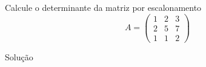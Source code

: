 \begin{question}
  Calcule o determinante da matriz por escalonamento
  \[
    A =
    \begin{pmatrix}
      1 & 2 & 3 \\
      2 & 5 & 7 \\
      1 & 1 & 2
    \end{pmatrix}
  \]
\end{question}

\begin{resolution}{Solução}
\end{resolution}

\endinput

Aplicamos
\[
L_2\leftarrow L_2-2L_1
\]
e
\[
L_3\leftarrow L_3-L_1.
\]

Essas operações não alteram o determinante
\[
\det(A)=
\begin{vmatrix}
1&2&3\\
0&1&1\\
0&-1&-1
\end{vmatrix}.
\]

Agora aplicamos
\[
L_3\leftarrow L_3+L_2.
\]

Obtemos
\[
\det(A)=
\begin{vmatrix}
1&2&3\\
0&1&1\\
0&0&0
\end{vmatrix}.
\]


Como a matriz é triangular,
\[
\det(A)=1\cdot1\cdot0=0.
\]

